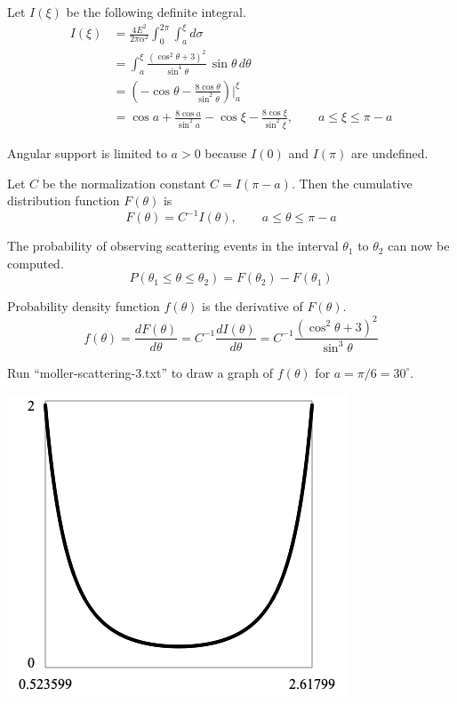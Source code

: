 \documentclass[12pt]{article}
\begin{document}
\noindent
Let $I(\xi)$ be the following definite integral.
\begin{align*}
I(\xi)&=\frac{4E^2}{2\pi\alpha^2}\int_0^{2\pi}\int_a^\xi d\sigma
\\
&=\int_a^\xi\frac{\left(\cos^2\theta+3\right)^2}{\sin^4\theta}\,\sin\theta\,d\theta
\\
&=\left(-\cos\theta-\frac{8\cos\theta}{\sin^2\theta}\right)\bigg|_a^\xi
\\
&=\cos a+\frac{8\cos a}{\sin^2 a}-\cos\xi-\frac{8\cos\xi}{\sin^2\xi},
\qquad a\le\xi\le\pi-a
\end{align*}

\noindent
Angular support is limited to $a>0$ because $I(0)$ and $I(\pi)$ are undefined.

\bigskip
\noindent
Let $C$ be the normalization constant $C=I(\pi-a)$.
Then the cumulative distribution function $F(\theta)$ is
\begin{equation*}
F(\theta)=C^{-1}I(\theta),\qquad a\le\theta\le\pi-a
\end{equation*}

\noindent
The probability of observing scattering events in the interval $\theta_1$ to $\theta_2$
can now be computed.
\begin{equation*}
P(\theta_1\le\theta\le\theta_2)=F(\theta_2)-F(\theta_1)
\end{equation*}

\noindent
Probability density function $f(\theta)$ is the derivative of $F(\theta)$.
\begin{equation*}
f(\theta)=\frac{dF(\theta)}{d\theta}
=C^{-1}\frac{dI(\theta)}{d\theta}
=C^{-1}\frac{\left(\cos^2\theta+3\right)^2}{\sin^3\theta}
\end{equation*}

\noindent
Run ``moller-scattering-3.txt'' to draw a graph of $f(\theta)$ for $a=\pi/6=30^\circ$.

\begin{center}
\includegraphics[scale=0.5]{moller-scattering.png}
\end{center}
\end{document}
